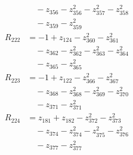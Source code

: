 \begin{align*}
&\quad -z_{356} -z_{356}^{2} -z_{357}^{2} -z_{358}^{2} \\
&\quad -z_{359} -z_{359}^{2} \\
R_{222} &= -1 +z_{124} -z_{360}^{2} -z_{361}^{2} \\
&\quad -z_{362} -z_{362}^{2} -z_{363}^{2} -z_{364}^{2} \\
&\quad -z_{365} -z_{365}^{2} \\
R_{223} &= -1 +z_{122} -z_{366}^{2} -z_{367}^{2} \\
&\quad -z_{368} -z_{368}^{2} -z_{369}^{2} -z_{370}^{2} \\
&\quad -z_{371} -z_{371}^{2} \\
R_{224} &= z_{181} +z_{182} -z_{372}^{2} -z_{373}^{2} \\
&\quad -z_{374} -z_{374}^{2} -z_{375}^{2} -z_{376}^{2} \\
&\quad -z_{377} -z_{377}^{2} \\
\end{align*}
\endgroup
